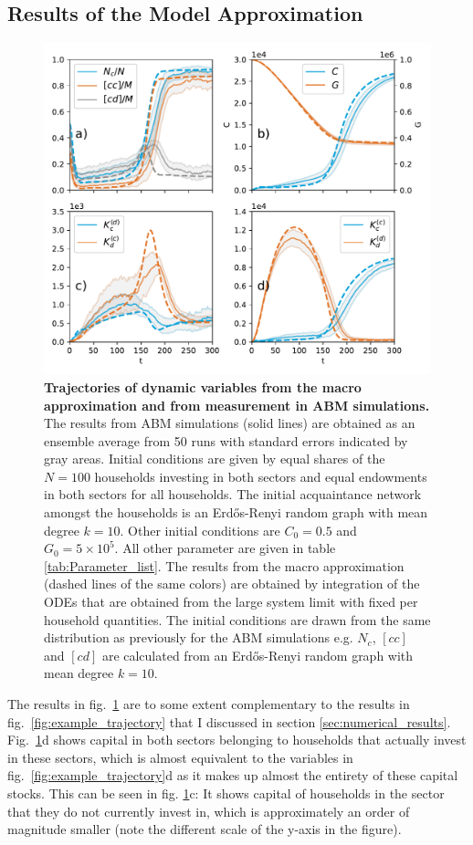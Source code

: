 \subsection{Results of the Model Approximation}

\begin{figure}[ht!]
\centering\includegraphics[width=.9\linewidth]{figures/micro_vs_approx_v2.pdf}
\caption{\textbf{Trajectories of dynamic variables from the macro approximation and from measurement in ABM simulations.} The results from ABM simulations (solid lines) are obtained as an ensemble average from 50 runs with standard errors indicated by gray areas. Initial conditions are given by equal shares of the $N=100$ households investing in both sectors and equal endowments in both sectors for all households. The initial acquaintance network amongst the households is an Erd\H{o}s-Renyi random graph with mean degree $k=10$. Other initial conditions are $C_0=0.5$ and $G_0=5 \times 10^5$. All other parameter are given in table \ref{tab:Parameter_list}. The results from the macro approximation (dashed lines of the same colors) are obtained by integration of the ODEs that are obtained from the large system limit with fixed per household quantities. The initial conditions are drawn from the same distribution as previously for the ABM simulations e.g. $N_c$, $[cc]$ and $[cd]$ are calculated from an Erd\H{o}s-Renyi random graph with mean degree $k=10$.}
\label{fig:comparison2}
\end{figure}
The results in  fig.~\ref{fig:comparison2} are to some extent complementary to the results in fig.~\ref{fig:example_trajectory} that I discussed in section \ref{sec:numerical_results}. Fig.~\ref{fig:comparison2}d shows capital in both sectors belonging to households that actually invest in these sectors, which is almost equivalent to the variables in fig.~\ref{fig:example_trajectory}d as it makes up almost the entirety of these capital stocks. This can be seen in fig. \ref{fig:comparison2}c: It shows capital of households in the sector that they do not currently invest in, which is approximately an order of magnitude smaller (note the different scale of the y-axis in the figure).

